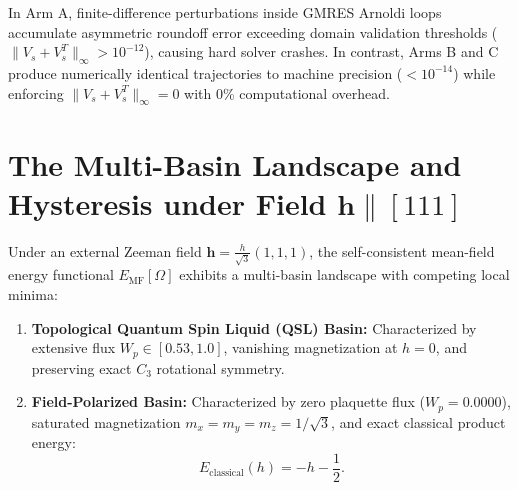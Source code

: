 \begin{proposition}
\label{thm:m1_6_ab_failure}
In Arm A, finite-difference perturbations inside GMRES Arnoldi loops accumulate asymmetric roundoff error exceeding domain validation thresholds ($\|V_s + V_s^T\|_\infty > 10^{-12}$), causing hard solver crashes. In contrast, Arms B and C produce numerically identical trajectories to machine precision ($< 10^{-14}$) while enforcing $\|V_s + V_s^T\|_\infty = 0$ with 0\% computational overhead.
\end{proposition}

\section{The Multi-Basin Landscape and Hysteresis under Field $\mathbf{h} \parallel [111]$}
\label{sec:m1_6_hysteresis}

Under an external Zeeman field $\mathbf{h} = \frac{h}{\sqrt{3}}(1, 1, 1)$, the self-consistent mean-field energy functional $E_{\mathrm{MF}}[\Omega]$ exhibits a multi-basin landscape with competing local minima:
\begin{enumerate}
\item \textbf{Topological Quantum Spin Liquid (QSL) Basin:} Characterized by extensive flux $W_p \in [0.53, 1.0]$, vanishing magnetization at $h=0$, and preserving exact $C_3$ rotational symmetry.
\item \textbf{Field-Polarized Basin:} Characterized by zero plaquette flux ($W_p = 0.0000$), saturated magnetization $m_x = m_y = m_z = 1/\sqrt{3}$, and exact classical product energy:
\begin{equation}
\label{eq:m1_6_classical_energy}
E_{\mathrm{classical}}(h) = -h - \frac{1}{2}.
\end{equation}
\end{enumerate}

